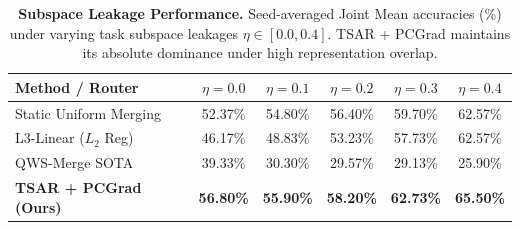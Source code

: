 \begin{table}[t]
\caption{\textbf{Subspace Leakage Performance.} Seed-averaged Joint Mean accuracies (\%) under varying task subspace leakages $\eta \in [0.0, 0.4]$. TSAR + PCGrad maintains its absolute dominance under high representation overlap.}
\label{tab:leakage_table}
\vskip 0.15in
\begin{center}
\begin{small}
\begin{sc}
\setlength{\tabcolsep}{8pt}
\begin{tabular}{lccccc}
\toprule
Method / Router & $\eta=0.0$ & $\eta=0.1$ & $\eta=0.2$ & $\eta=0.3$ & $\eta=0.4$ \\
\midrule
Static Uniform Merging & 52.37\% & 54.80\% & 56.40\% & 59.70\% & 62.57\% \\
L3-Linear ($L_2$ Reg) & 46.17\% & 48.83\% & 53.23\% & 57.73\% & 62.57\% \\
QWS-Merge SOTA & 39.33\% & 30.30\% & 29.57\% & 29.13\% & 25.90\% \\
\textbf{TSAR + PCGrad (Ours)} & \textbf{56.80\%} & \textbf{55.90\%} & \textbf{58.20\%} & \textbf{62.73\%} & \textbf{65.50\%} \\
\bottomrule
\end{tabular}
\end{sc}
\end{small}
\end{center}
\vskip -0.1in
\end{table}

